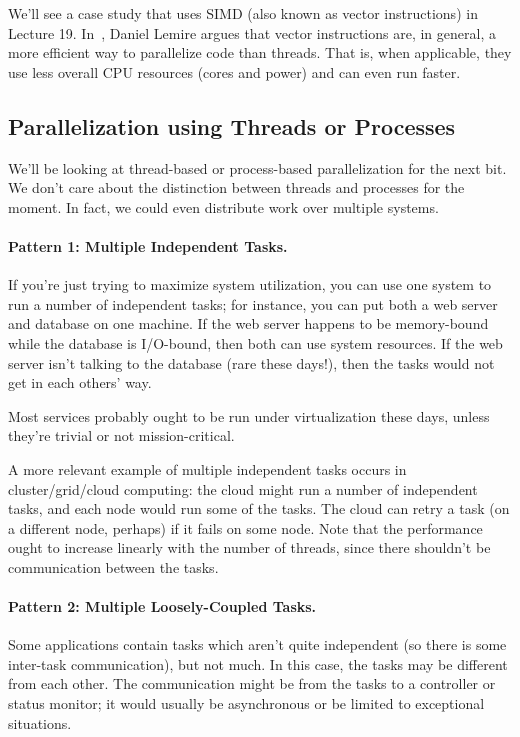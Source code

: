 We'll see a case study that uses SIMD (also known as vector
instructions) in Lecture 19. In~\cite{lemire18:_multic_simd}, Daniel Lemire argues that vector
instructions are, in general, a more efficient way to parallelize code
than threads. That is, when applicable, they use less overall CPU
resources (cores and power) and can even run faster.

\subsection*{Parallelization using Threads or Processes}
We'll be looking at thread-based or process-based parallelization for the
next bit. We don't care about the distinction between threads and processes
for the moment. In fact, we could even distribute work over multiple systems.

\paragraph{Pattern 1: Multiple Independent Tasks.} If you're just trying to maximize
system utilization, you can use one system to run a number of independent
tasks; for instance, you can put both a web server and database on
one machine. If the web server happens to be memory-bound while the
database is I/O-bound, then both can use system resources. If the web
server isn't talking to the database (rare these days!), then the tasks
would not get in each others' way.

Most services probably ought to be run under virtualization these
days, unless they're trivial or not mission-critical.

A more relevant example of multiple independent tasks occurs in
cluster/grid/cloud computing: the cloud might run a number of
independent tasks, and each node would run some of the tasks. The
cloud can retry a task (on a different node, perhaps) if it fails on
some node. Note that the performance ought to increase linearly with
the number of threads, since there shouldn't be communication between
the tasks.

\paragraph{Pattern 2: Multiple Loosely-Coupled Tasks.} Some applications contain
tasks which aren't quite independent (so there is some inter-task
communication), but not much.  In this case, the tasks may be
different from each other. The communication might be from the tasks
to a controller or status monitor; it would usually be asynchronous or
be limited to exceptional situations.

